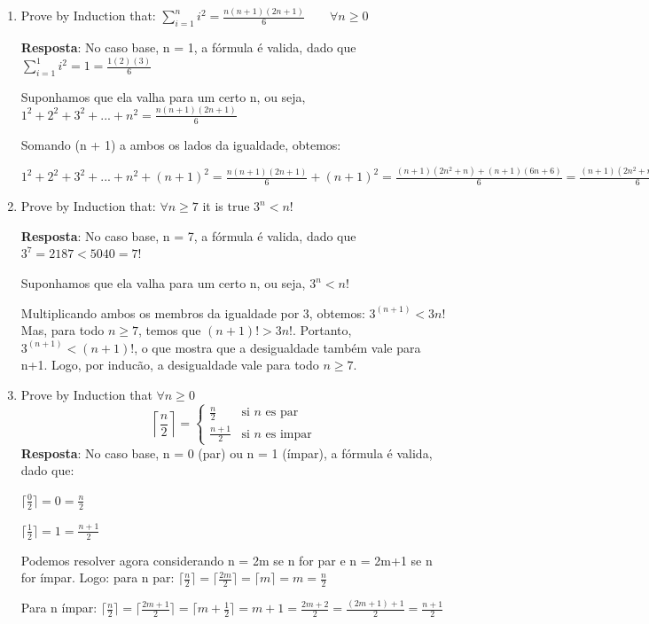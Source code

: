 \documentclass{article}
\begin{document}
	\begin{enumerate}
		\item Prove by Induction that:
		\( \sum_{i=1}^{n}i^2=\frac{n(n+1)(2n+1)}{6} \qquad\forall n \geq 0\)
		
		\textbf{Resposta}: No caso base, n = 1, a fórmula é valida, dado que \( \sum_{i=1}^{1}i^2=1 = \frac{1(2)(3)}{6} \)
		
		Suponhamos que ela valha para um certo n, ou seja, 
		\( 1^2+2^2+3^2+...+n^2 = \frac{n(n+1)(2n+1)}{6} \)
		
		Somando (n + 1) a ambos os lados da igualdade, obtemos:
		
		\( 1^2+2^2+3^2+...+n^2+(n+1)^2 = \frac{n(n+1)(2n+1)}{6}+(n+1)^2 =  \frac{(n+1)(2n^2+n) + (n+1)(6n+6)}{6} = \frac{(n+1)(2n^2+n+6n+6)}{6} = \frac{(n+1)(2n^2+7n+6)}{6} = \frac{(n+1)(n+2)(2n+3)}{6}\)
		
		\item Prove by Induction that:
		$\forall n \geq 7$ it is true $3^n<n!$
		
		\textbf{Resposta}: No caso base, n = 7, a fórmula é valida, dado que $3^7 = 2187 < 5040= 7!$
		
		Suponhamos que ela valha para um certo n, ou seja, 
		$3^n<n!$
		
		Multiplicando ambos os membros da igualdade por 3, obtemos: \(3^{(n+1)}<3n!\)
		Mas, para todo $n \geq 7$, temos que $(n+1)! > 3n!$. Portanto, $3^{(n+1)}<(n+1)!$, o
		que mostra que a desigualdade também vale para n+1. Logo, por inducão, a desigualdade vale para todo $n \geq 7$.
		
		\item Prove by Induction that $\forall n \geq 0$
		\[
		\left \lceil\frac{n}{2} \right \rceil=
		\left\{
		\begin{array}{ll}
		\frac{n}{2}& \textrm{si $n$ es par}\\
		\frac{n+1}{2}& \textrm{si $n$ es impar}
		\end{array}
		\right.
		\]
		\textbf{Resposta}: No caso base, n = 0 (par) ou n = 1 (ímpar), a fórmula é valida, dado que:
		
		$\lceil\frac{0}{2} \rceil= 0 = \frac{n}{2}$
		
		$\lceil\frac{1}{2} \rceil= 1 = \frac{n+1}{2}$
		
		Podemos resolver agora considerando n = 2m se n for par e n = 2m+1 se n for ímpar. Logo: para n par: $\lceil\frac{n}{2} \rceil= \lceil\frac{2m}{2} \rceil= \lceil m \rceil = m = \frac{n}{2}$
		
		Para n ímpar: $\lceil\frac{n}{2} \rceil= \lceil\frac{2m+1}{2} \rceil= \lceil m+\frac{1}{2} \rceil = m + 1= \frac{2m+2}{2} = \frac{(2m+1)+1}{2} = \frac{n+1}{2}$
		

\end{enumerate}
\end{document}
